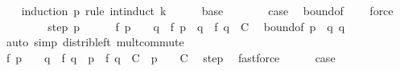 \begin{isabellebody}
\ \ \isamarkupfalse%
\ {\isacharparenleft}{\kern0pt}induction\ p\ rule{\isacharcolon}{\kern0pt}\ int{\isacharunderscore}{\kern0pt}induct{\isacharbrackleft}{\kern0pt}\ {\isacharquery}{\kern0pt}k{\isacharequal}{\kern0pt}{}{\isacharbrackright}{\kern0pt}{\isacharparenright}{\kern0pt}\isanewline
\ \ \ \ \isamarkupfalse%
\ base\isanewline
\ \ \ \ \isamarkupfalse%
\ \isamarkupfalse%
\ {\isacharquery}{\kern0pt}case\ \isamarkupfalse%
\ bound{\isacharbrackleft}{\kern0pt}of\ {}\ {}{\isacharbrackright}{\kern0pt}\ \isamarkupfalse%
\ force\isanewline
\ \ \isamarkupfalse%
\isanewline
\ \ \ \ \isamarkupfalse%
\ {\isacharparenleft}{\kern0pt}step{}\ p{\isacharparenright}{\kern0pt}\isanewline
\ \ \ \ \isamarkupfalse%
\ {\isachardoublequoteopen}{\isasymbar}f\ {\isacharparenleft}{\kern0pt}{\isacharparenleft}{\kern0pt}p\ {\isacharplus}{\kern0pt}\ {}{\isacharparenright}{\kern0pt}\ {\isacharasterisk}{\kern0pt}\ q{\isacharparenright}{\kern0pt}\ {\isacharminus}{\kern0pt}\ f\ {\isacharparenleft}{\kern0pt}p\ {\isacharasterisk}{\kern0pt}\ q{\isacharparenright}{\kern0pt}\ {\isacharminus}{\kern0pt}\ f\ q{\isasymbar}\ {\isasymle}\ C{\isachardoublequoteclose}\ \isamarkupfalse%
\ bound{\isacharbrackleft}{\kern0pt}of\ {\isachardoublequoteopen}p\ {\isacharasterisk}{\kern0pt}\ q{\isachardoublequoteclose}\ q{\isacharbrackright}{\kern0pt}\ \ \isamarkupfalse%
\ {\isacharparenleft}{\kern0pt}auto\ simp{\isacharcolon}{\kern0pt}\ distrib{\isacharunderscore}{\kern0pt}left\ mult{\isachardot}{\kern0pt}commute{\isacharparenright}{\kern0pt}\isanewline
\ \ \ \ \isamarkupfalse%
\ {\isachardoublequoteopen}{\isasymbar}f\ {\isacharparenleft}{\kern0pt}{\isacharparenleft}{\kern0pt}p\ {\isacharplus}{\kern0pt}\ {}{\isacharparenright}{\kern0pt}\ {\isacharasterisk}{\kern0pt}\ q{\isacharparenright}{\kern0pt}\ {\isacharminus}{\kern0pt}\ f\ q\ {\isacharminus}{\kern0pt}\ p\ {\isacharasterisk}{\kern0pt}\ f\ q{\isasymbar}\ {\isasymle}\ C\ {\isacharplus}{\kern0pt}\ {\isacharparenleft}{\kern0pt}{\isasymbar}p{\isasymbar}\ {\isacharplus}{\kern0pt}\ {}{\isacharparenright}{\kern0pt}\ {\isacharasterisk}{\kern0pt}\ C{\isachardoublequoteclose}\ \isamarkupfalse%
\ step{}\ \isamarkupfalse%
\ fastforce\isanewline
\ \ \ \ \isamarkupfalse%
\ {\isacharquery}{\kern0pt}case\ \isamarkupfalse%

\end{isabellebody}
